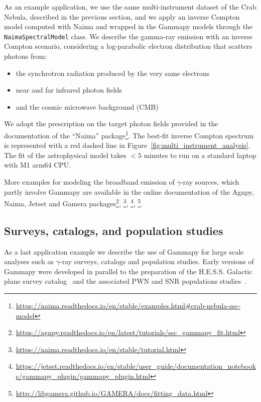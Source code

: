 \documentclass[longauth]{aa}
\newcommand{\code}[1]{\texttt{#1}}
\newcommand{\gammapy}{Gammapy\xspace}
\newcommand{\hess}{H.E.S.S.\xspace}
\newcommand{\gammaray}{$\gamma$-ray\xspace}
\begin{document}
As an example application, we use the same multi-instrument
dataset of the Crab Nebula, described in the previous section,
and we apply an inverse
Compton model computed with Naima and wrapped in the \gammapy models
through the \code{NaimaSpectralModel} class. We describe the gamma-ray emission 
with an inverse Compton scenario, considering a log-parabolic
electron distribution that scatters photons from:
%
\begin{itemize}
        \item the synchrotron radiation produced by
        the very same electrons
        \item near and far infrared photon fields
        \item and the cosmic microwave background (CMB)
\end{itemize}
%
We adopt the prescription on the target photon fields provided in the documentation of the \enquote{Naima}
package\footnote{\url{https://naima.readthedocs.io/en/stable/examples.html\#crab-nebula-ssc-model}}.
The best-fit inverse Compton spectrum is represented with a red dashed line in
Figure~\ref{fig:multi_instrument_analysis}. The fit of the astrophysical model
takes $<5$ minutes to run on a standard laptop with M1 arm64 CPU.

More examples for modeling the broadband emission of \gammaray sources, which 
partly involve \gammapy are available in the online documentation of the
Agnpy, Naima, Jetset and Gamera packages\footnote{\url{https://agnpy.readthedocs.io/en/latest/tutorials/ssc\_gammapy\_fit.html}},
\footnote{\url{https://naima.readthedocs.io/en/stable/tutorial.html}}, 
\footnote{\url{https://jetset.readthedocs.io/en/stable/user\_guide/documentation\_notebooks/gammapy\_plugin/gammapy\_plugin.html}},
\footnote{\url{http://libgamera.github.io/GAMERA/docs/fitting\_data.html}}.



\subsection{Surveys, catalogs, and population studies}
\label{ssec:surveys-catalogs-and-population-studies}
As a last application example we describe the use of \gammapy for large scale
analyses such as \gammaray surveys, catalogs and population studies.
Early versions of \gammapy were developed in parallel to the preparation of
the \hess Galactic plane survey catalog~\citep[HGPS, ][]{2018A&A...612A...1H} and
the associated PWN and SNR populations studies~\citep{2018A&A...612A...2H,2018A&A...612A...3H}. 
\end{document}
